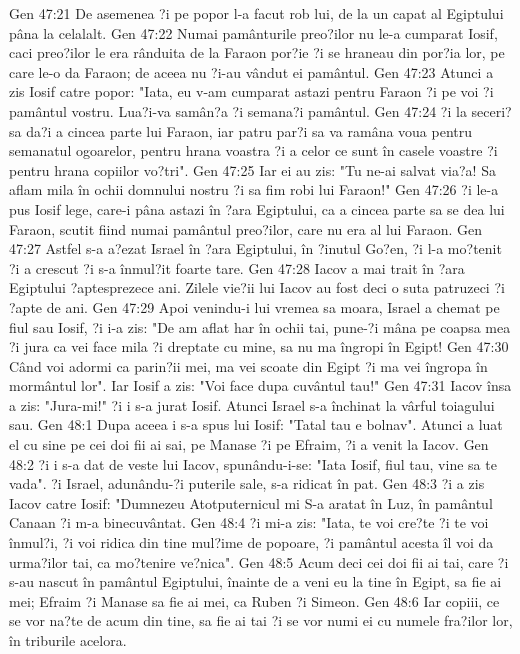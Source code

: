 Gen 47:21  De asemenea ?i pe popor l-a facut rob lui, de la un capat al Egiptului pâna la celalalt.
Gen 47:22  Numai pamânturile preo?ilor nu le-a cumparat Iosif, caci preo?ilor le era rânduita de la Faraon por?ie ?i se hraneau din por?ia lor, pe care le-o da Faraon; de aceea nu ?i-au vândut ei pamântul.
Gen 47:23  Atunci a zis Iosif catre popor: "Iata, eu v-am cumparat astazi pentru Faraon ?i pe voi ?i pamântul vostru. Lua?i-va samân?a ?i semana?i pamântul.
Gen 47:24  ?i la seceri? sa da?i a cincea parte lui Faraon, iar patru par?i sa va ramâna voua pentru semanatul ogoarelor, pentru hrana voastra ?i a celor ce sunt în casele voastre ?i pentru hrana copiilor vo?tri".
Gen 47:25  Iar ei au zis: "Tu ne-ai salvat via?a! Sa aflam mila în ochii domnului nostru ?i sa fim robi lui Faraon!"
Gen 47:26  ?i le-a pus Iosif lege, care-i pâna astazi în ?ara Egiptului, ca a cincea parte sa se dea lui Faraon, scutit fiind numai pamântul preo?ilor, care nu era al lui Faraon.
Gen 47:27  Astfel s-a a?ezat Israel în ?ara Egiptului, în ?inutul Go?en, ?i l-a mo?tenit ?i a crescut ?i s-a înmul?it foarte tare.
Gen 47:28  Iacov a mai trait în ?ara Egiptului ?aptesprezece ani. Zilele vie?ii lui Iacov au fost deci o suta patruzeci ?i ?apte de ani.
Gen 47:29  Apoi venindu-i lui vremea sa moara, Israel a chemat pe fiul sau Iosif, ?i i-a zis: "De am aflat har în ochii tai, pune-?i mâna pe coapsa mea ?i jura ca vei face mila ?i dreptate cu mine, sa nu ma îngropi în Egipt!
Gen 47:30  Când voi adormi ca parin?ii mei, ma vei scoate din Egipt ?i ma vei îngropa în mormântul lor". Iar Iosif a zis: "Voi face dupa cuvântul tau!"
Gen 47:31  Iacov însa a zis: "Jura-mi!" ?i i s-a jurat Iosif. Atunci Israel s-a închinat la vârful toiagului sau.
Gen 48:1  Dupa aceea i s-a spus lui Iosif: "Tatal tau e bolnav". Atunci a luat el cu sine pe cei doi fii ai sai, pe Manase ?i pe Efraim, ?i a venit la Iacov.
Gen 48:2  ?i i s-a dat de veste lui Iacov, spunându-i-se: "Iata Iosif, fiul tau, vine sa te vada". ?i Israel, adunându-?i puterile sale, s-a ridicat în pat.
Gen 48:3  ?i a zis Iacov catre Iosif: "Dumnezeu Atotputernicul mi S-a aratat în Luz, în pamântul Canaan ?i m-a binecuvântat.
Gen 48:4  ?i mi-a zis: "Iata, te voi cre?te ?i te voi înmul?i, ?i voi ridica din tine mul?ime de popoare, ?i pamântul acesta îl voi da urma?ilor tai, ca mo?tenire ve?nica".
Gen 48:5  Acum deci cei doi fii ai tai, care ?i s-au nascut în pamântul Egiptului, înainte de a veni eu la tine în Egipt, sa fie ai mei; Efraim ?i Manase sa fie ai mei, ca Ruben ?i Simeon.
Gen 48:6  Iar copiii, ce se vor na?te de acum din tine, sa fie ai tai ?i se vor numi ei cu numele fra?ilor lor, în triburile acelora.
